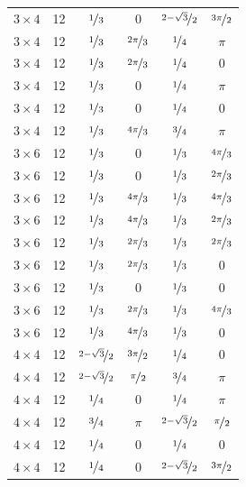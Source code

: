 \documentclass{article}
\begin{document}
\begin{longtable}{cccccc}
$3 \times 4$ & 12 & $\nicefrac{1}{3}$ & 0 & $\nicefrac{2-\sqrt{3}}{2}$ & $\nicefrac{3\pi}{2}$ \\
$3 \times 4$ & 12 & $\nicefrac{1}{3}$ & $\nicefrac{2\pi}{3}$ & $\nicefrac{1}{4}$ & $\pi$ \\
$3 \times 4$ & 12 & $\nicefrac{1}{3}$ & $\nicefrac{2\pi}{3}$ & $\nicefrac{1}{4}$ & 0 \\
$3 \times 4$ & 12 & $\nicefrac{1}{3}$ & 0 & $\nicefrac{1}{4}$ & $\pi$ \\
$3 \times 4$ & 12 & $\nicefrac{1}{3}$ & 0 & $\nicefrac{1}{4}$ & 0 \\
$3 \times 4$ & 12 & $\nicefrac{1}{3}$ & $\nicefrac{4\pi}{3}$ & $\nicefrac{3}{4}$ & $\pi$ \\
$3 \times 6$ & 12 & $\nicefrac{1}{3}$ & 0 & $\nicefrac{1}{3}$ & $\nicefrac{4\pi}{3}$ \\
$3 \times 6$ & 12 & $\nicefrac{1}{3}$ & 0 & $\nicefrac{1}{3}$ & $\nicefrac{2\pi}{3}$ \\
$3 \times 6$ & 12 & $\nicefrac{1}{3}$ & $\nicefrac{4\pi}{3}$ & $\nicefrac{1}{3}$ & $\nicefrac{4\pi}{3}$ \\
$3 \times 6$ & 12 & $\nicefrac{1}{3}$ & $\nicefrac{4\pi}{3}$ & $\nicefrac{1}{3}$ & $\nicefrac{2\pi}{3}$ \\
$3 \times 6$ & 12 & $\nicefrac{1}{3}$ & $\nicefrac{2\pi}{3}$ & $\nicefrac{1}{3}$ & $\nicefrac{2\pi}{3}$ \\
$3 \times 6$ & 12 & $\nicefrac{1}{3}$ & $\nicefrac{2\pi}{3}$ & $\nicefrac{1}{3}$ & 0 \\
$3 \times 6$ & 12 & $\nicefrac{1}{3}$ & 0 & $\nicefrac{1}{3}$ & 0 \\
$3 \times 6$ & 12 & $\nicefrac{1}{3}$ & $\nicefrac{2\pi}{3}$ & $\nicefrac{1}{3}$ & $\nicefrac{4\pi}{3}$ \\
$3 \times 6$ & 12 & $\nicefrac{1}{3}$ & $\nicefrac{4\pi}{3}$ & $\nicefrac{1}{3}$ & 0 \\
$4 \times 4$ & 12 & $\nicefrac{2-\sqrt{3}}{2}$ & $\nicefrac{3\pi}{2}$ & $\nicefrac{1}{4}$ & 0 \\
$4 \times 4$ & 12 & $\nicefrac{2-\sqrt{3}}{2}$ & $\nicefrac{\pi}{2}$ & $\nicefrac{3}{4}$ & $\pi$ \\
$4 \times 4$ & 12 & $\nicefrac{1}{4}$ & 0 & $\nicefrac{1}{4}$ & $\pi$ \\
$4 \times 4$ & 12 & $\nicefrac{3}{4}$ & $\pi$ & $\nicefrac{2-\sqrt{3}}{2}$ & $\nicefrac{\pi}{2}$ \\
$4 \times 4$ & 12 & $\nicefrac{1}{4}$ & 0 & $\nicefrac{1}{4}$ & 0 \\
$4 \times 4$ & 12 & $\nicefrac{1}{4}$ & 0 & $\nicefrac{2-\sqrt{3}}{2}$ & $\nicefrac{3\pi}{2}$ \\

\end{longtable}
\end{document}
